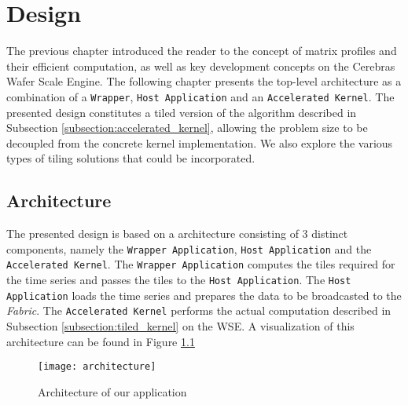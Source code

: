 \chapter{Design}\label{chapter:design}

The previous chapter introduced the reader to the concept of matrix profiles and their efficient computation, as well as key development concepts on the Cerebras Wafer Scale Engine. The following chapter presents the top-level architecture as a combination of a \texttt{Wrapper}, \texttt{Host Application} and an \texttt{Accelerated Kernel}. The presented design constitutes a tiled version of the algorithm described in Subsection \ref{subsection:accelerated_kernel}, allowing the problem size to be decoupled from the concrete kernel implementation. We also explore the various types of tiling solutions that could be incorporated.

\clearpage
\section{Architecture} \label{section:arch}

The presented design is based on a architecture consisting of 3 distinct components, namely the \texttt{Wrapper Application}, \texttt{Host Application} and the \texttt{Accelerated Kernel}. The \texttt{Wrapper Application} computes the tiles required for the time series and passes the tiles to the \texttt{Host Application}. The \texttt{Host Application} loads the time series and prepares the data to be broadcasted to the \textit{Fabric}. The \texttt{Accelerated Kernel} performs the actual computation described in Subsection \ref{subsection:tiled_kernel} on the WSE. A visualization of this architecture can be found in Figure \ref{fig:architecture}

\begin{figure}[h!]
    \texttt{[image: architecture]}
    \centering
    \caption{Architecture of our application}
    \label{fig:architecture}
\end{figure}

